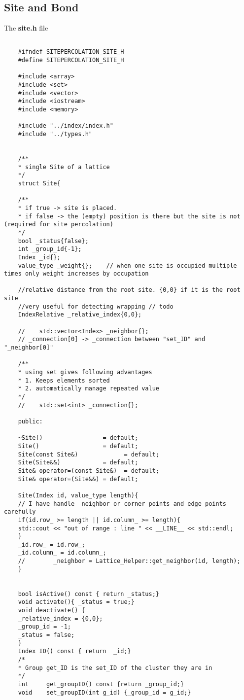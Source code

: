 	\subsection{Site and Bond}
	The \textbf{site.h} file
	\begin{lstlisting}[style=CStyle]

	#ifndef SITEPERCOLATION_SITE_H
	#define SITEPERCOLATION_SITE_H
	
	#include <array>
	#include <set>
	#include <vector>
	#include <iostream>
	#include <memory>
	
	#include "../index/index.h"
	#include "../types.h"
	
	
	/**
	* single Site of a lattice
	*/
	struct Site{
	
	/**
	* if true -> site is placed.
	* if false -> the (empty) position is there but the site is not (required for site percolation)
	*/
	bool _status{false};
	int _group_id{-1};
	Index _id{};
	value_type _weight{};    // when one site is occupied multiple times only weight increases by occupation
	
	//relative distance from the root site. {0,0} if it is the root site
	//very useful for detecting wrapping // todo
	IndexRelative _relative_index{0,0};
	
	//    std::vector<Index> _neighbor{};
	// _connection[0] -> _connection between "set_ID" and "_neighbor[0]"
	
	/**
	* using set gives following advantages
	* 1. Keeps elements sorted
	* 2. automatically manage repeated value
	*/
	//    std::set<int> _connection{};
	
	public:
	
	~Site()                 = default;
	Site()                  = default;
	Site(const Site&)             = default;
	Site(Site&&)            = default;
	Site& operator=(const Site&)  = default;
	Site& operator=(Site&&) = default;
	
	Site(Index id, value_type length){
	// I have handle _neighbor or corner points and edge points carefully
	if(id.row_ >= length || id.column_ >= length){
	std::cout << "out of range : line " << __LINE__ << std::endl;
	}
	_id.row_ = id.row_;
	_id.column_ = id.column_;
	//        _neighbor = Lattice_Helper::get_neighbor(id, length);
	}
	
	
	bool isActive() const { return _status;}
	void activate(){ _status = true;}
	void deactivate() {
	_relative_index = {0,0};
	_group_id = -1;
	_status = false;
	}
	Index ID() const { return  _id;}
	/*
	* Group get_ID is the set_ID of the cluster they are in
	*/
	int     get_groupID() const {return _group_id;}
	void    set_groupID(int g_id) {_group_id = g_id;}
	

\end{lstlisting}
